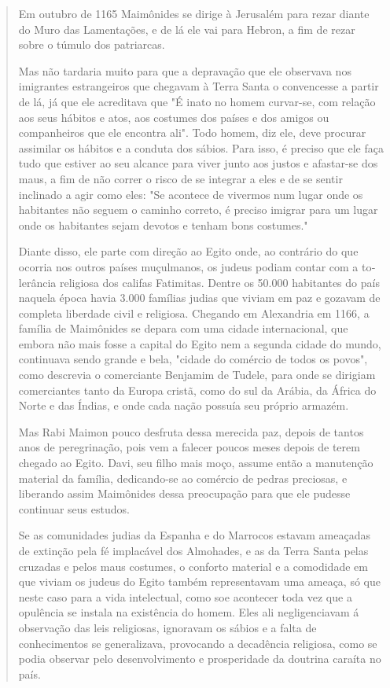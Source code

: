 \begin{quote}
Em outubro de 1165 Maimônides se dirige à Jerusalém para rezar dian­te
do Muro das Lamentações, e de lá ele vai para Hebron, a fim de rezar
sobre o túmulo dos patriarcas.

Mas não tardaria muito para que a depravação que ele observava nos
imigrantes estrangeiros que chegavam à Terra Santa o convencesse a
partir de lá, já que ele acreditava que "É inato no homem curvar-se, com
relação aos seus hábitos e atos, aos costumes dos países e dos amigos ou
companheiros que ele encontra ali". Todo homem, diz ele, deve procurar
assimilar os hábitos e a con­duta dos sábios. Para isso, é preciso que
ele faça tudo que estiver ao seu alcan­ce para viver junto aos justos e
afastar-se dos maus, a fim de não correr o risco de se integrar a eles e
de se sentir inclinado a agir como eles: "Se acontece de vivermos num
lugar onde os habitantes não seguem o caminho correto, é pre­ciso
imigrar para um lugar onde os habitantes sejam devotos e tenham bons
costumes."

Diante disso, ele parte com direção ao Egito onde, ao contrário do que
ocorria nos outros países muçulmanos, os judeus podiam contar com a
to­lerância religiosa dos califas Fatimitas. Dentre os 50.000 habitantes
do país na­quela época havia 3.000 famílias judias que viviam em paz e
gozavam de com­pleta liberdade civil e religiosa. Chegando em Alexandria
em 1166, a família de Maimônides se depara com uma cidade internacional,
que embora não mais fosse a capital do Egito nem a segunda cidade do
mundo, continuava sendo grande e bela, "cidade do comércio de todos os
povos", como descrevia o co­merciante Benjamim de Tudele, para onde se
dirigiam comerciantes tanto da Europa cristã, como do sul da Arábia, da
África do Norte e das Índias, e onde cada nação possuía seu próprio
armazém.

Mas Rabi Maimon pouco desfruta dessa merecida paz, depois de tan­tos
anos de peregrinação, pois vem a falecer poucos meses depois de terem
chegado ao Egito. Davi, seu filho mais moço, assume então a manutenção
ma­terial da família, dedicando-se ao comércio de pedras preciosas, e
liberando as­sim Maimônides dessa preocupação para que ele pudesse
continuar seus estudos.

Se as comunidades judias da Espanha e do Marrocos estavam amea­çadas de
extinção pela fé implacável dos Almohades, e as da Terra Santa pelas
cruzadas e pelos maus costumes, o conforto material e a comodidade em
que viviam os judeus do Egito também representavam uma ameaça, só que
neste caso para a vida intelectual, como soe acontecer toda vez que a
opulência se instala na existência do homem. Eles ali negligenciavam á
observação das leis religiosas, ignoravam os sábios e a falta de
conhecimentos se generalizava, pro­vocando a decadência religiosa, como
se podia observar pelo desenvolvimen­to e prosperidade da doutrina
caraíta no país.


\end{quote}
